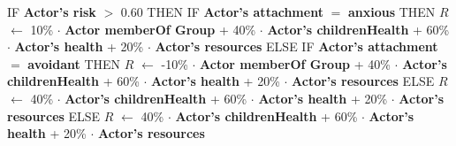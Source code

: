 \documentclass{article}%
\begin{document}
%
\begin{flushleft}%
IF %
\textbf{Actor's risk}%
$>$%
0.60%
\linebreak%
\hspace*{2em}%
THEN %
IF %
\textbf{Actor's attachment}%
$=$%
\textbf{anxious}%
\linebreak%
\hspace*{4em}%
THEN %
$R$%
$\leftarrow$%
10\%%
$\cdot$%
\textbf{Actor memberOf Group}%
+%
40\%%
$\cdot$%
\textbf{Actor's childrenHealth}%
+%
60\%%
$\cdot$%
\textbf{Actor's health}%
+%
20\%%
$\cdot$%
\textbf{Actor's resources}%
\linebreak%
\hspace*{4em}%
ELSE %
IF %
\textbf{Actor's attachment}%
$=$%
\textbf{avoidant}%
\linebreak%
\hspace*{6em}%
THEN %
$R$%
$\leftarrow$%
{-}10\%%
$\cdot$%
\textbf{Actor memberOf Group}%
+%
40\%%
$\cdot$%
\textbf{Actor's childrenHealth}%
+%
60\%%
$\cdot$%
\textbf{Actor's health}%
+%
20\%%
$\cdot$%
\textbf{Actor's resources}%
\linebreak%
\hspace*{6em}%
ELSE %
$R$%
$\leftarrow$%
40\%%
$\cdot$%
\textbf{Actor's childrenHealth}%
+%
60\%%
$\cdot$%
\textbf{Actor's health}%
+%
20\%%
$\cdot$%
\textbf{Actor's resources}%
\linebreak%
\hspace*{2em}%
ELSE %
$R$%
$\leftarrow$%
40\%%
$\cdot$%
\textbf{Actor's childrenHealth}%
+%
60\%%
$\cdot$%
\textbf{Actor's health}%
+%
20\%%
$\cdot$%
\textbf{Actor's resources}%
\end{flushleft}

%
\end{document}
